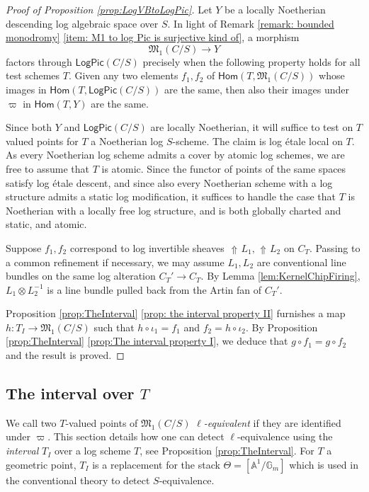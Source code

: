 \documentclass[11pt]{amsart}
\theoremstyle{definition}
\theoremstyle{definition}
\DeclareMathOperator{\arrowup}{\!\Uparrow \!}
\begin{document}
\begin{proof}[Proof of Proposition \ref{prop:LogVBtoLogPic}]
    Let $Y$ be a locally Noetherian descending log algebraic space over $S$. In light of Remark \ref{remark: bounded monodromy} \eqref{item: M1 to log Pic is surjective kind of}, a morphism $$\mathfrak{M}_1(C/S) \longrightarrow Y$$ factors through $\mathsf{LogPic}(C/S)$ precisely when the following property holds for all test schemes $T$. Given any two elements $f_1,f_2$ of $\mathsf{Hom}(T,\mathfrak{M}_1(C/S))$ whose images in $\mathsf{Hom}(T,\mathsf{LogPic}(C/S))$ are the same, then also their images under $\varpi$ in $\mathsf{Hom}(T,Y)$ are the same.

    Since both $Y$ and $\mathsf{LogPic}({C/S})$ are locally Noetherian, it will suffice to test on $T$ valued points for $T$ a Noetherian log $S$-scheme.
    The claim is log \'etale local on $T$.
    As every Noetherian log scheme admits a cover by atomic log schemes, we are free to assume that $T$ is atomic. Since the functor of points of the same spaces satisfy log \'etale descent, and since also every Noetherian scheme with a log structure admits a static log modification, it suffices to handle the case that $T$ is Noetherian with a locally free log structure, and is both globally charted and static, and atomic. 

    Suppose $f_1,f_2$ correspond to log invertible sheaves $\arrowup L_1,\arrowup L_2$ on $C_T$. Passing to a common refinement if necessary, we may assume $L_1,L_2$ are conventional line bundles on the same log alteration $C_T'\rightarrow C_T$. 
    By Lemma \ref{lem:KernelChipFiring}, $L_1\otimes L_2^{-1}$ is a line bundle pulled back from the Artin fan of $C_T'$.
    
    Proposition \ref{prop:TheInterval} \eqref{prop: the interval property II} furnishes a map $h\colon T_I\rightarrow \mathfrak{M}_1(C/S)$ such that $h\circ \iota_1 =f_1$ and $f_2= h\circ \iota_2$.  By Proposition \ref{prop:TheInterval} \eqref{prop:The interval property I}, we deduce that $g\circ f_1=g\circ f_2$ and the result is proved.
\end{proof}

\subsection{The interval over $T$}\label{sec:theInterval} 
We call two $T$-valued points of $\mathfrak{M}_{1}(C/S)$ \textit{$\ell$-equivalent} if they are identified under $\varpi$. This section details how one can detect $\ell$-equivalence using the \textit{interval} $T_I$ over a log scheme $T$, see Proposition \ref{prop:TheInterval}. For $T$ a geometric point, $T_I$ is a replacement for the stack $\Theta = [\mathbb{A}^1/\mathbb{G}_m]$ which is used in the conventional theory to detect $S$-equivalence.
\end{document}
